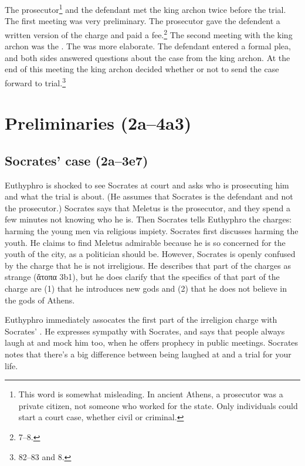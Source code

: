 \documentclass[11pt]{article}
\begin{document}
The prosecutor\footnote{This word is somewhat misleading.  In ancient
Athens, a prosecutor was a private citizen, not someone who worked for the
state.  Only individuals could start a court case, whether civil or
criminal.} and the defendant met the king archon twice before the trial.
The first meeting was very preliminary.  The prosecutor gave the defendent
a written version of the charge and paid a fee.\footnote
{\citet{brickhouse2004} 7--8.}  The second meeting with the king archon was
the .  The  was more elaborate. The
defendant entered a formal plea, and both sides answered questions about the
case from the king archon.  At the end of this meeting the king archon
decided whether or not to send the case forward to trial.\footnote
{\citet{burnet1924} 82--83 and \citet{brickhouse2004} 8.}

\section{Preliminaries (2a--4a3)}

\subsection{Socrates' case (2a--3e7)}

Euthyphro is shocked to see Socrates at court and asks who is prosecuting
him and what the trial is about.  (He assumes that Socrates is the
defendant and not the prosecutor.)  Socrates says that Meletus is the
prosecutor, and they spend a few minutes not knowing who he is.  Then
Socrates tells Euthyphro the charges: harming the young men via religious
impiety.  Socrates first discusses harming the youth.  He claims to find
Meletus admirable because he is so concerned for the youth of the city, as
a politician should be.  However, Socrates is openly confused by the charge
that he is not irreligious.  He describes that part of the charges as
strange (ἄτοπα 3b1), but he does clarify that the specifics of that part of
the charge are (1) that he introduces new gods and (2) that he does not
believe in the gods of Athens.

Euthyphro immediately assocates the first part of the irreligion charge
with Socrates' .  He expresses sympathy with Socrates,
and says that people always laugh at and mock him too, when he offers
prophecy in public meetings.  Socrates notes that there's a big difference
between being laughed at and a trial for your life.
\end{document}
